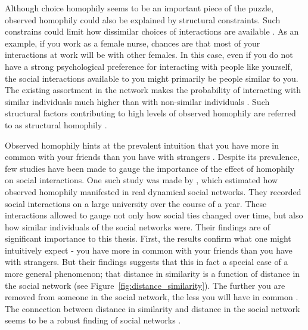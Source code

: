 \documentclass[11pt]{article}
\begin{document}
Although choice homophily seems to be an important piece of the puzzle, observed homophily could also be explained by structural constraints. Such constrains could limit how dissimilar choices of interactions are available \cite{peixoto_disentangling_2022}. As an example, if you work as a female nurse, chances are that most of your interactions at work will be with other females. 
In this case, even if you do not have a strong psychological preference for interacting with people like yourself, the social interactions available to you might primarily be people similar to you. 
The existing assortment in the network makes the probability of interacting with similar individuals much higher than with non-similar individuals \cite{peixoto_disentangling_2022}. Such structural factors contributing to high levels of observed homophily are referred to as structural homophily \cite{asikainen_cumulative_2020,mcpherson_birds_2001,winter_you_2020}. 

\noindent Observed homophily hints at the prevalent intuition that you have more in common with your friends than you have with strangers \cite{mcpherson_birds_2001}.
Despite its prevalence, few studies have been made to gauge the importance of the effect of homophily on social interactions. One such study was made by , which estimated how observed homophily manifested in real dynamical social networks. They recorded social interactions on a large university over the course of a year. These interactions allowed  to gauge not only how social ties changed over time, but also how similar individuals of the social networks were. Their findings are of significant importance to this thesis. First, the results confirm what one might intuitively expect - you have more in common with your friends than you have with strangers. But their findings suggests that this in fact a special case of a more general phenomenon; that distance in similarity is a function of distance in the social network (see Figure~\ref{fig:distance_similarity}). The further you are removed from someone in the social network, the less you will have in common \cite{kossinets_origins_2009}. 
The connection between distance in similarity and distance in the social network seems to be a robust finding of social networks \cite{bener_empirical_2016,crandall_feedback_2008}.
\end{document}
